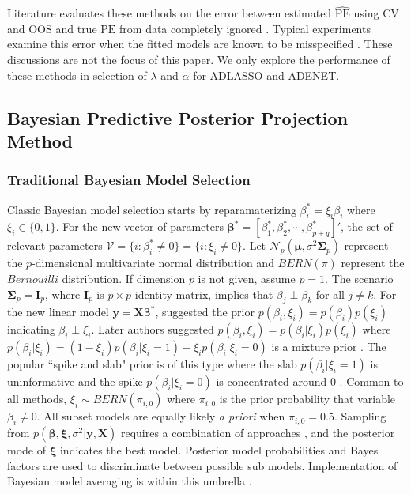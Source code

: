 Literature evaluates these methods on the error between estimated $\widehat{\textrm{PE}}$ using CV and OOS and true $\textrm{PE}$ from data completely ignored \citep{Bergmeir2014,Bergmeir2018}. Typical experiments examine this error when the fitted models are known to be misspecified \citep{Burman1994,Racine2000,Bergmeir2018}. These discussions are not the focus of this paper. We only explore the performance of these methods in selection of $\lambda$ and $\alpha$ for ADLASSO and ADENET. 

\subsection{Bayesian Predictive Posterior Projection Method}
\subsubsection{Traditional Bayesian Model Selection}
Classic Bayesian model selection starts by reparamaterizing $\beta_i^*=\xi_i\beta_i$ where $\xi_i\in\{0,1\}$. For the new vector of parameters $\bm{\beta}^*=[\beta^*_1,\beta^*_2,\cdots,\beta^*_{p+q}]'$, the set of relevant parameters $\mathcal{V}=\{i:\beta^*_i\neq 0\}=\{i:\xi_i\neq 0\}$. Let $\mathcal{N}_p(\bm{\mu},\sigma^2\bm{\Sigma}_p)$ represent the $p$-dimensional multivariate normal distribution and $BERN(\pi)$ represent the $Bernouilli$ distribution. If dimension $p$ is not given, assume $p=1$. The scenario $\bm{\Sigma}_p=\bm{I}_p$, where $\bm{I}_p$ is $p\times p$ identity matrix, implies that $\beta_j\perp\beta_k$ for all $j\neq k$. For the new linear model  $\bm{y}=\bm{X}\bm{\beta}^*$, \cite{Kuo1998} suggested the prior $p(\beta_i,\xi_i)=p(\beta_i)p(\xi_i)$ indicating $\beta_i \perp \xi_i$. Later authors suggested $p(\beta_i,\xi_i)=p(\beta_i|\xi_i)p(\xi_i)$ where $p(\beta_i|\xi_i)=(1-\xi_i)p(\beta_i|\xi_i=1)+\xi_i p(\beta_i|\xi_i=0) $ is a mixture prior \citep{Carlin1995}. The popular ``spike and slab" prior is of this type where the slab $p(\beta_i|\xi_i=1)$ is uninformative and the spike $p(\beta_i|\xi_i=0)$ is concentrated around 0 \citep{Mitchell1988,George1993, Carlin1995}. Common to all methods, $\xi_i \sim BERN(\pi_{i,0})$ where $\pi_{i,0}$ is the prior probability that variable $\beta_i \neq 0$. All subset models are equally likely \textit{a priori} when $\pi_{i,0}=0.5$. Sampling from $p(\bm{\beta},\bm{\xi},\sigma^2|\bm{y},\bm{X})$ requires a combination of approaches \citep{Dellaportas2002}, and the posterior mode of $\bm{\xi}$ indicates the best model. Posterior model probabilities and Bayes factors are used to discriminate between possible sub models. Implementation of Bayesian model averaging is within this umbrella \citep{Raftery1997,Hoeting1998,Hoeting1999}.

